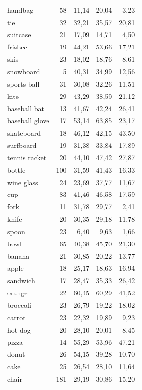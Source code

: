 \begin{longtable}{lrrrr}
handbag & 58 & 11{,}14 & 20{,}04 & 3{,}23 \\
tie & 32 & 32{,}21 & 35{,}57 & 20{,}81 \\
suitcase & 21 & 17{,}09 & 14{,}71 & 4{,}50 \\
frisbee & 19 & 44{,}21 & 53{,}66 & 17{,}21 \\
skis & 23 & 18{,}02 & 18{,}76 & 8{,}61 \\
snowboard & 5 & 40{,}31 & 34{,}99 & 12{,}56 \\
sports ball & 31 & 30{,}08 & 32{,}26 & 11{,}51 \\
kite & 29 & 43{,}29 & 38{,}59 & 21{,}12 \\
baseball bat & 13 & 41{,}67 & 42{,}24 & 26{,}41 \\
baseball glove & 17 & 53{,}14 & 63{,}85 & 23{,}17 \\
skateboard & 18 & 46{,}12 & 42{,}15 & 43{,}50 \\
surfboard & 19 & 31{,}38 & 33{,}84 & 17{,}89 \\
tennis racket & 20 & 44{,}10 & 47{,}42 & 27{,}87 \\
bottle & 100 & 31{,}59 & 41{,}43 & 16{,}33 \\
wine glass & 24 & 23{,}69 & 37{,}77 & 11{,}67 \\
cup & 83 & 41{,}46 & 46{,}58 & 17{,}59 \\
fork & 11 & 31{,}78 & 29{,}77 & 2{,}41 \\
knife & 20 & 30{,}35 & 29{,}18 & 11{,}78 \\
spoon & 23 & 6{,}40 & 9{,}63 & 1{,}66 \\
bowl & 65 & 40{,}38 & 45{,}70 & 21{,}30 \\
banana & 21 & 30{,}85 & 20{,}22 & 13{,}77 \\
apple & 18 & 25{,}17 & 18{,}63 & 16{,}94 \\
sandwich & 17 & 28{,}47 & 35{,}33 & 26{,}42 \\
orange & 22 & 60{,}45 & 60{,}29 & 41{,}52 \\
broccoli & 23 & 26{,}79 & 19{,}22 & 18{,}02 \\
carrot & 23 & 22{,}32 & 19{,}89 & 9{,}23 \\
hot dog & 20 & 28{,}10 & 20{,}01 & 8{,}45 \\
pizza & 14 & 55{,}29 & 53{,}96 & 47{,}21 \\
donut & 26 & 54{,}15 & 39{,}28 & 10{,}70 \\
cake & 25 & 26{,}54 & 28{,}10 & 11{,}64 \\
chair & 181 & 29{,}19 & 30{,}86 & 15{,}20 \\

\end{longtable}
